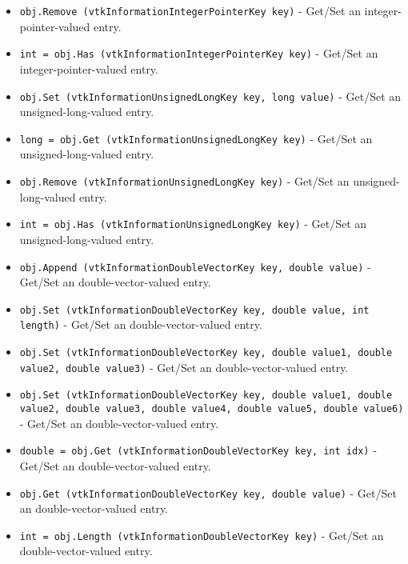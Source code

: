 \begin{itemize}
\item  \verb|obj.Remove (vtkInformationIntegerPointerKey key)| -  Get/Set an integer-pointer-valued entry.

\item  \verb|int = obj.Has (vtkInformationIntegerPointerKey key)| -  Get/Set an integer-pointer-valued entry.

\item  \verb|obj.Set (vtkInformationUnsignedLongKey key, long value)| -  Get/Set an unsigned-long-valued entry.

\item  \verb|long = obj.Get (vtkInformationUnsignedLongKey key)| -  Get/Set an unsigned-long-valued entry.

\item  \verb|obj.Remove (vtkInformationUnsignedLongKey key)| -  Get/Set an unsigned-long-valued entry.

\item  \verb|int = obj.Has (vtkInformationUnsignedLongKey key)| -  Get/Set an unsigned-long-valued entry.

\item  \verb|obj.Append (vtkInformationDoubleVectorKey key, double value)| -  Get/Set an double-vector-valued entry.

\item  \verb|obj.Set (vtkInformationDoubleVectorKey key, double value, int length)| -  Get/Set an double-vector-valued entry.

\item  \verb|obj.Set (vtkInformationDoubleVectorKey key, double value1, double value2, double value3)| -  Get/Set an double-vector-valued entry.

\item  \verb|obj.Set (vtkInformationDoubleVectorKey key, double value1, double value2, double value3, double value4, double value5, double value6)| -  Get/Set an double-vector-valued entry.

\item  \verb|double = obj.Get (vtkInformationDoubleVectorKey key, int idx)| -  Get/Set an double-vector-valued entry.

\item  \verb|obj.Get (vtkInformationDoubleVectorKey key, double value)| -  Get/Set an double-vector-valued entry.

\item  \verb|int = obj.Length (vtkInformationDoubleVectorKey key)| -  Get/Set an double-vector-valued entry.


\end{itemize}

